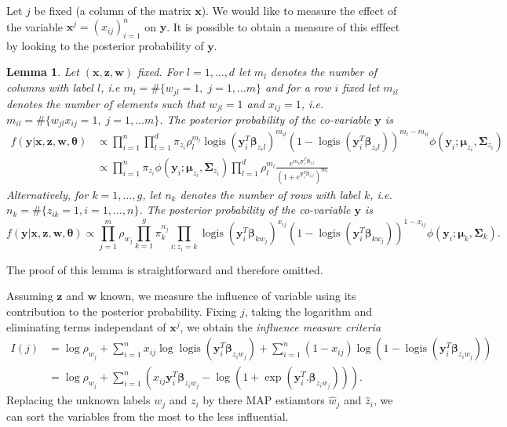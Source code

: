 \documentclass[a4paper]{article}
\DeclareMathOperator{\logis}{logis}
\newcommand{\bw}{\mathbf{w}}
\newcommand{\bx}{\mathbf{x}}
\newcommand{\by}{\mathbf{y}}
\newcommand{\bz}{\mathbf{z}}
\newcommand{\bbeta}{\boldsymbol{\beta}}
\newcommand{\bmu}{\boldsymbol{\mu}}
\newcommand{\bSigma}{\boldsymbol{\Sigma}}
\newcommand{\btheta}{\boldsymbol{\theta}}
\newtheorem{lemma}{Lemma}
\begin{document}
Let $j$ be fixed (a column of the matrix $\bx$). We would like to 
measure the effect of the variable
$\bx^j=(x_{ij})_{i=1}^n$ on $\by$. It is possible to obtain a measure
of this efffect by looking to the
posterior probability of $\by$.
\begin{lemma}
Let $(\bx,\bz,\bw)$ fixed. For $l=1,\ldots,d$ let $m_{l}$ denotes the number of columns with label $l$,
i.e $m_l = \#\{w_{jl} = 1,\; j=1,\ldots m\}$ and for a row $i$ fixed let $m_{il}$ denotes the number of
elements such that ${w_{jl} = 1}$ and $x_{ij} =1$, i.e. $m_{il}=\#\{w_{jl}x_{ij} = 1,\; j=1,\ldots m\}$.
The posterior probability of the co-variable $\by$ is
\begin{align}\label{eq:co-posterior-row}
f(\by|\bx,\bz,\bw,\btheta) & \propto \prod_{i=1}^n \prod_{l=1}^{d} \pi_{z_i} \rho_{l}^{m_l}
  \logis(\by_i^T\bbeta_{z_i l})^{m_{il}}
  \left(1-\logis(\by_i^T\bbeta_{z_i l})\right)^{m_l-m_{il}}
  \phi(\by_i;\bmu_{z_{i}},\bSigma_{z_{i}}) \nonumber \\
  & \propto \prod_{i=1}^n  \pi_{z_i} \phi(\by_i;\bmu_{z_{i}},\bSigma_{z_{i}})
           \prod_{l=1}^{d} \rho_{l}^{m_l}   
  \frac{e^{m_{il}\by_i^T\bbeta_{z_i l}}}{\left(1+e^{\by_i^T\bbeta_{z_i l}} \right)^{m_l}}
\end{align}
Alternatively, for $k=1,\ldots,g$, let $n_k$ denotes the number of rows with label $k$,
i.e. $n_k = \#\{z_{ik}=1, i=1,\ldots,n\}$. The posterior probability of the co-variable $\by$
is
\begin{equation}\label{eq:co-posterior-col}
f(\by|\bx,\bz,\bw,\btheta)  \propto \prod_{j=1}^m \rho_{w_{j}}
\prod_{k=1}^{g} \pi_{k}^{n_j} \prod_{i:z_i=k} \logis(\by_i^T\bbeta_{k w_j})^{x_{ij}}
  \left(1-\logis(\by_i^T\bbeta_{k w_j})\right)^{1-x_{ij}}
  \phi(\by_i;\bmu_{k},\bSigma_{k}).
\end{equation}
\end{lemma}
The proof of this lemma is straightforward and therefore omitted.

Assuming $\bz$ and $\bw$ known, we measure the influence of variable 
using its contribution to the posterior probability. Fixing $j$,
taking the logarithm and eliminating terms independant of
$\bx^j$, we obtain the \textit{influence measure criteria}
\begin{align}
I(j)& = \log\rho_{w_{j}} +\sum_{i=1}^n {x_{ij}}\log\logis(\by_i^T\bbeta_{z_i  w_j})
 +\sum_{i=1}^n {(1-x_{ij})}\log\left(1-\logis(\by_i^T\bbeta_{z_i w_j})\right) \nonumber \\
 &  = \log\rho_{w_{j}} + \sum_{i=1}^n \left( x_{ij} \by_{i}^{T}\bbeta_{z_i w_j} - \log({1+\exp(\by_{i}^{T}.\bbeta_{z_i w_j})}) \right).
\end{align}
Replacing the unknown labels $w_j$ and $z_i$ by there MAP estiamtors  $\hat{w}_j$ and $\hat{z}_i$, we
can sort the variables from the most to the less influential.
\end{document}
